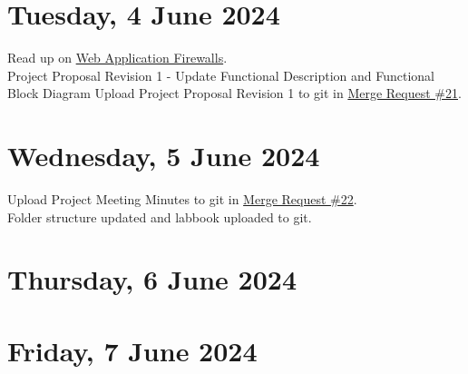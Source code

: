 \section[2024/06/04]{Tuesday, 4 June 2024}
Read up on \href{https://www.geeksforgeeks.org/what-is-a-web-application-firewall/?ref=ml_lbp}{Web Application Firewalls}.\\
Project Proposal Revision 1 - Update Functional Description and Functional Block Diagram
Upload Project Proposal Revision 1 to git in \href{https://repo.ee.up.ac.za/eece_ugfyp_tg/2024_isg/tg4-koot-u20426471/-/merge_requests/21}{Merge Request \#21}.\\
\pendsign

\section[2024/06/05]{Wednesday, 5 June 2024}
Upload Project Meeting Minutes to git in \href{https://repo.ee.up.ac.za/eece_ugfyp_tg/2024_isg/tg4-koot-u20426471/-/merge_requests/22}{Merge Request \#22}.\\
Folder structure updated and labbook uploaded to git.\\
\pendsign

\section[2024/06/06]{Thursday, 6 June 2024}

\pendsign

\section[2024/06/07]{Friday, 7 June 2024}

\pendsign



